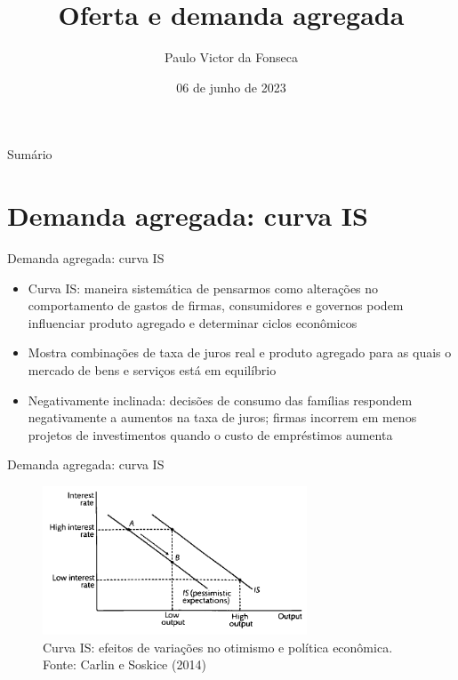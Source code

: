 \documentclass[10pt]{beamer}
\title[]{Oferta e demanda agregada}
\author[]{Paulo Victor da Fonseca}
\date{06 de junho de 2023}
\begin{document}
\begin{frame}[plain]
\end{frame}

\begin{frame}{Sumário}
    \tableofcontents
\end{frame}

\section{Demanda agregada: curva IS}
\begin{frame}
    {Demanda agregada: curva IS}
    \begin{itemize}
        \item Curva IS: maneira sistemática de pensarmos como alterações no comportamento de gastos de firmas, consumidores e governos podem influenciar produto agregado e determinar ciclos econômicos\bigskip
        \item Mostra combinações de taxa de juros real e produto agregado para as quais o mercado de bens e serviços está em equilíbrio\bigskip
        \item Negativamente inclinada: decisões de consumo das famílias respondem negativamente a aumentos na taxa de juros; firmas incorrem em menos projetos de investimentos quando o custo de empréstimos aumenta
    \end{itemize}
\end{frame}

\begin{frame}
    {Demanda agregada: curva IS}
    \begin{figure}
        \includegraphics[width=0.7\textwidth]{./figures/aula6_fig1.PNG}
        \caption{Curva IS: efeitos de variações no otimismo e política econômica. Fonte: Carlin e Soskice (2014)}
    \end{figure}
\end{frame}
\end{document}
